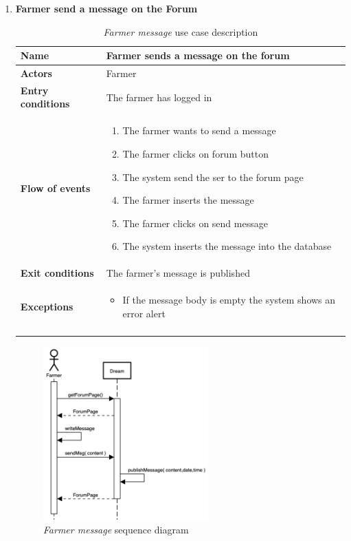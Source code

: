 \begin{enumerate}
    \item \textbf{Farmer send a message on the Forum}
        \begin{longtable}{p{0.26\linewidth}p{0.75\linewidth}}
            \toprule
            \textbf{Name} & \textbf{Farmer sends a message on the forum} \\
            \midrule
            \textbf{Actors} & Farmer \\
            \midrule
            \textbf{Entry conditions} & The farmer has logged in\\
            \midrule
            \textbf{Flow of events} & 
            \begin{enumerate}
                \item The farmer wants to send a message
                \item The farmer clicks on forum button
                \item The system send the ser to the forum page
                \item The farmer inserts the message 
                \item The farmer clicks on send message
                \item The system inserts the message into the database 
            \end{enumerate} \\
            \midrule
            \textbf{Exit conditions} & The farmer's message is published\\
            \midrule
            \textbf{Exceptions} & 
            \begin{itemize}
                \item If the message body is empty the system shows an error alert
            \end{itemize} \\
            \bottomrule
            \caption{\emph{Farmer message} use case description}
        \end{longtable}

        \begin{figure}[H]
            \begin{center}
            \includegraphics[width=0.6\textwidth]{sequence/messageOnForum.png}
            \caption{\emph{Farmer message} sequence diagram}
            \label{fig:sequence3}
        \end{center}
        \end{figure}


\end{enumerate}
